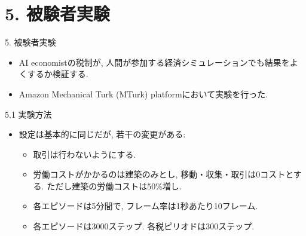 \documentclass[unicode,aspectratio=169,11pt]{beamer}
\begin{document}
\section{5. 被験者実験}

\begin{frame}{5. 被験者実験}{}
    \begin{itemize}
        \item AI economistの税制が, 人間が参加する経済シミュレーションでも結果をよくするか検証する.
        \item Amazon Mechanical Turk (MTurk) platformにおいて実験を行った.
    \end{itemize}
\end{frame}

\begin{frame}{5.1 実験方法}{}
    \begin{itemize}
        \item 設定は基本的に同じだが, 若干の変更がある:
        \begin{itemize}
            \item 取引は行わないようにする.
            \item 労働コストがかかるのは建築のみとし, 移動・収集・取引は0コストとする. ただし建築の労働コストは$50\%$増し.
            \item 各エピソードは5分間で, フレーム率は1秒あたり10フレーム.
            \item 各エピソードは3000ステップ. 各税ピリオドは300ステップ.
        \end{itemize}
    \end{itemize}
\end{frame}
\end{document}
